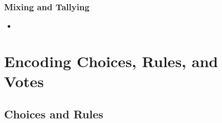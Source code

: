 \documentclass[bibtotoc,halfparskip,oneside]{scrreprt}
\begin{document}
\subsubsection{Mixing and Tallying}
\begin{itemize}
	\item 
\end{itemize}

\section{Encoding Choices, Rules, and Votes}

\subsection{Choices and Rules}\label{choices}
\end{document}
